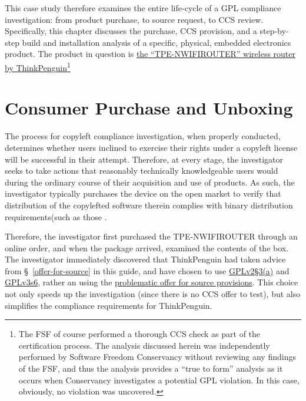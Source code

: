 This case study therefore examines the entire life-cycle of a GPL compliance
investigation: from product purchase, to source request, to CCS review.
Specifically, this chapter discusses the purchase, CCS provision, and a
step-by-step build and installation analysis of a specific, physical,
embedded electronics product.  The product in question is
\href{https://www.thinkpenguin.com/gnu-linux/free-software-wireless-n-broadband-router-gnu-linux-tpe-nwifirouter}{the
  ``TPE-NWIFIROUTER'' wireless router by ThinkPenguin}\footnote{The FSF of
  course performed a thorough CCS check as part of the certification process.
  The analysis discussed herein was independently performed by Software
  Freedom Conservancy without reviewing any findings of the FSF, and thus the
  analysis provides a ``true to form'' analysis as it occurs when Conservancy
  investigates a potential GPL violation.  In this case, obviously, no
  violation was uncovered.}

\section{Consumer Purchase and Unboxing}

The process for copyleft compliance investigation, when properly conducted,
determines whether users inclined to exercise their rights under a copyleft
license will be successful in their attempt.  Therefore, at every stage, the
investigator seeks to take actions that reasonably technically knowledgeable
users would during the ordinary course of their acquisition and use of
products.  As such, the investigator typically purchases the device on the
open market to verify that distribution of the copylefted software therein
complies with binary distribution requirements(such as those
.


\label{thinkpenguin-included-ccs}

Therefore, the investigator first purchased the TPE-NWIFIROUTER through an
online order, and when the package arrived, examined the contents of the box.
The investigator immediately discovered that ThinkPenguin had taken advice
from \S~\ref{offer-for-source} in this guide, and have chosen to use
\hyperref[GPLv2s3a]{GPLv2\S3(a)} and \hyperref[GPLv3s6]{GPLv3s6}, rather an
using the \hyperref[offer-for-source]{problematic offer for source
  provisions}.  This choice not only speeds up the investigation (since there
is no CCS offer to test), but also simplifies the compliance requirements for
ThinkPenguin.

